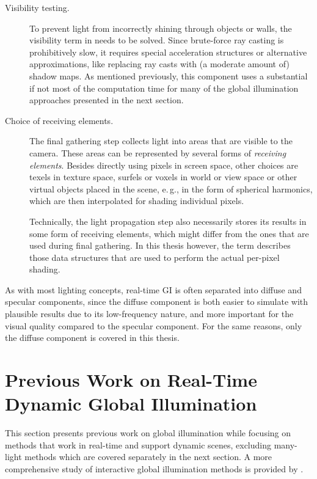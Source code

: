 \begin{description}
    \item[Visibility testing.] To prevent light from incorrectly shining through objects or walls, the visibility term in  needs to be solved. Since brute-force ray casting is prohibitively slow, it requires special acceleration structures or alternative approximations, like replacing ray casts with (a moderate amount of) shadow maps. As mentioned previously, this component uses a substantial if not most of the computation time for many of the global illumination approaches presented in the next section.
    \item[Choice of receiving elements.]
    The final gathering step collects light into areas that are visible to the camera. These areas can be represented by several forms of \textit{receiving elements}. Besides directly using pixels in screen space, other choices are texels in texture space, surfels or voxels in world or view space or other virtual objects placed in the scene, e.\,g., in the form of spherical harmonics, which are then interpolated for shading individual pixels.

    Technically, the light propagation step also necessarily stores its results in some form of receiving elements, which might differ from the ones that are used during final gathering. In this thesis however, the term describes those data structures that are used to perform the actual per-pixel shading.
\end{description}%
%
As with most lighting concepts, real-time GI is often separated into diffuse and specular components, since the diffuse component is both easier to simulate with plausible results due to its low-frequency nature, and more important for the visual quality compared to the specular component. For the same reasons, only the diffuse component is covered in this thesis.



\section{Previous Work on Real-Time Dynamic Global Illumination}
\label{sec:intro:gi:previousWork}

This section presents previous work on global illumination while focusing on methods that work in real-time and support dynamic scenes, excluding many-light methods which are covered separately in the next section. A more comprehensive study of interactive global illumination methods is provided by \citet{Ritschel:2012:GISTAR}.

